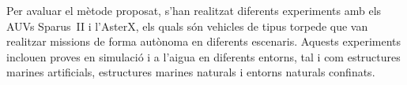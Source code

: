 Per avaluar el mètode proposat, s'han realitzat diferents experiments amb els
AUVs Sparus~II i l'AsterX, els quals són vehicles de tipus torpede que van
realitzar missions de forma autònoma en diferents escenaris. Aquests experiments
inclouen proves en simulació i a l'aigua en diferents entorns, tal i com
estructures marines artificials, estructures marines naturals i entorns naturals
confinats.


\vfill


\endgroup			

\vfill